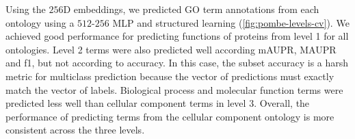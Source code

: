 %


Using the $256$D embeddings, we predicted GO term annotations from each ontology using a $512$-$256$ MLP and structured learning (\ref{fig:pombe-levels-cv}).
We achieved good performance for predicting functions of proteins from level 1 for all ontologies.
Level 2 terms were also predicted well according mAUPR, MAUPR and f1, but not according to accuracy.
In this case, the subset accuracy is a harsh metric for multiclass prediction because the vector of predictions must exactly match the vector of labels.
Biological process and molecular function terms were predicted less well than cellular component terms in level 3.
Overall, the performance of predicting terms from the cellular component ontology is more consistent across the three levels.



